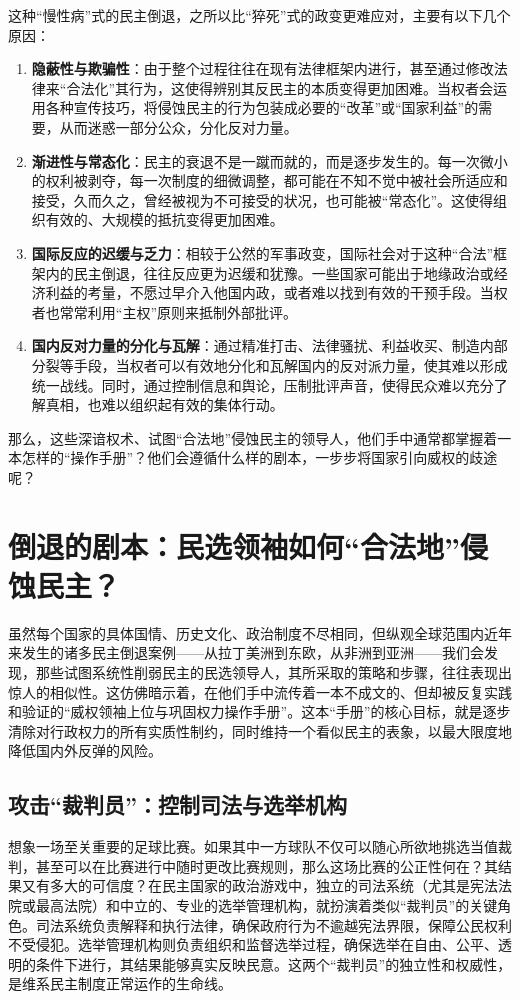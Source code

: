 \documentclass[UTF8, 10pt]{ctexbook}
\begin{document}
这种“慢性病”式的民主倒退，之所以比“猝死”式的政变更难应对，主要有以下几个原因：
\begin{enumerate}
    \item  \textbf{隐蔽性与欺骗性}：由于整个过程往往在现有法律框架内进行，甚至通过修改法律来“合法化”其行为，这使得辨别其反民主的本质变得更加困难。当权者会运用各种宣传技巧，将侵蚀民主的行为包装成必要的“改革”或“国家利益”的需要，从而迷惑一部分公众，分化反对力量。
    \item  \textbf{渐进性与常态化}：民主的衰退不是一蹴而就的，而是逐步发生的。每一次微小的权利被剥夺，每一次制度的细微调整，都可能在不知不觉中被社会所适应和接受，久而久之，曾经被视为不可接受的状况，也可能被“常态化”。这使得组织有效的、大规模的抵抗变得更加困难。
    \item  \textbf{国际反应的迟缓与乏力}：相较于公然的军事政变，国际社会对于这种“合法”框架内的民主倒退，往往反应更为迟缓和犹豫。一些国家可能出于地缘政治或经济利益的考量，不愿过早介入他国内政，或者难以找到有效的干预手段。当权者也常常利用“主权”原则来抵制外部批评。
    \item  \textbf{国内反对力量的分化与瓦解}：通过精准打击、法律骚扰、利益收买、制造内部分裂等手段，当权者可以有效地分化和瓦解国内的反对派力量，使其难以形成统一战线。同时，通过控制信息和舆论，压制批评声音，使得民众难以充分了解真相，也难以组织起有效的集体行动。
\end{enumerate}

那么，这些深谙权术、试图“合法地”侵蚀民主的领导人，他们手中通常都掌握着一本怎样的“操作手册”？他们会遵循什么样的剧本，一步步将国家引向威权的歧途呢？

\section{倒退的剧本：民选领袖如何“合法地”侵蚀民主？}
\lettrine[lines=2]{虽}{然}每个国家的具体国情、历史文化、政治制度不尽相同，但纵观全球范围内近年来发生的诸多民主倒退案例——从拉丁美洲到东欧，从非洲到亚洲——我们会发现，那些试图系统性削弱民主的民选领导人，其所采取的策略和步骤，往往表现出惊人的相似性。这仿佛暗示着，在他们手中流传着一本不成文的、但却被反复实践和验证的“威权领袖上位与巩固权力操作手册”。这本“手册”的核心目标，就是逐步清除对行政权力的所有实质性制约，同时维持一个看似民主的表象，以最大限度地降低国内外反弹的风险。

\subsection{攻击“裁判员”：控制司法与选举机构}
想象一场至关重要的足球比赛。如果其中一方球队不仅可以随心所欲地挑选当值裁判，甚至可以在比赛进行中随时更改比赛规则，那么这场比赛的公正性何在？其结果又有多大的可信度？在民主国家的政治游戏中，独立的司法系统（尤其是宪法法院或最高法院）和中立的、专业的选举管理机构，就扮演着类似“裁判员”的关键角色。司法系统负责解释和执行法律，确保政府行为不逾越宪法界限，保障公民权利不受侵犯。选举管理机构则负责组织和监督选举过程，确保选举在自由、公平、透明的条件下进行，其结果能够真实反映民意。这两个“裁判员”的独立性和权威性，是维系民主制度正常运作的生命线。
\end{document}
